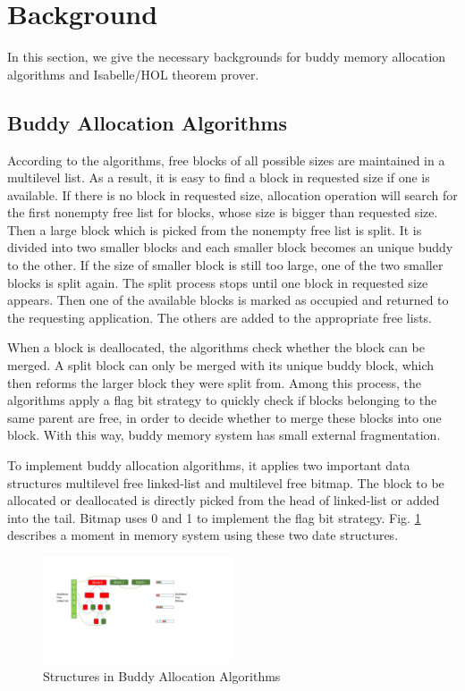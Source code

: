 \section{Background}
In this section, we give the necessary backgrounds for buddy memory allocation algorithms and Isabelle/HOL theorem prover.

\subsection{Buddy Allocation Algorithms}
According to the algorithms, free blocks of all possible sizes are maintained in a multilevel list. As a result, it is easy to find a block in requested size if one is available. If there is no block in requested size, allocation operation will search for the first nonempty free list for blocks, whose size is bigger than requested size. Then a large block which is picked from the nonempty free list is split. It is divided into two smaller blocks and each smaller block becomes an unique buddy to the other. If the size of smaller block is still too large, one of the two smaller blocks is split again. The split process stops until one block in requested size appears. Then one of the available blocks is marked as occupied and returned to the requesting application. The others are added to the appropriate free lists.

When a block is deallocated, the algorithms check whether the block can be merged. A split block can only be merged with its unique buddy block, which then reforms the larger block they were split from. Among this process, the algorithms apply a flag bit strategy to quickly check if blocks belonging to the same parent are free, in order to decide whether to merge these blocks into one block. With this way, buddy memory system has small external fragmentation.

To implement buddy allocation algorithms, it applies two important data structures multilevel free linked-list and multilevel free bitmap. The block to be allocated or deallocated is directly picked from the head of linked-list or added into the tail. Bitmap uses 0 and 1 to implement the flag bit strategy. Fig. \ref{fig3} describes a moment in memory system using these two date structures.

\begin{figure}[htbp]
	\centering
	\includegraphics[width=0.5\textwidth]{fig3.pdf}
	\caption{Structures in Buddy Allocation Algorithms}
	\label{fig3}
\end{figure}

